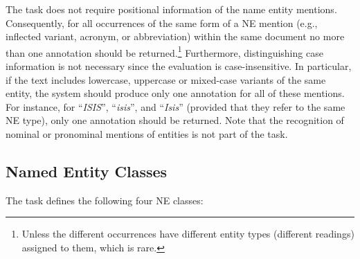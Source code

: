 \documentclass[11pt]{article}
\begin{document}
\noindent The task does not require positional information of the name entity mentions.
Consequently, for all occurrences of the same form of a NE mention (e.g., inflected variant,
acronym, or abbreviation) within the same document no more than one annotation should be
returned.\footnote{Unless the different occurrences have different entity types (different
  readings) assigned to them, which is rare.}  Furthermore, distinguishing case information is
not necessary since the evaluation is case-insensitive.  In particular, if the text includes
lowercase, uppercase or mixed-case variants of the same entity, the system should produce only
one annotation for all of these mentions.  For instance, for ``\textit{ISIS}'',
``\textit{isis}'', and ``\textit{Isis}'' (provided that they refer to the same NE type), only
one annotation should be returned.  Note that the recognition of nominal or pronominal
mentions of entities is not part of the task.

\subsection{Named Entity Classes}

{The task defines the following four NE classes:}
\end{document}
